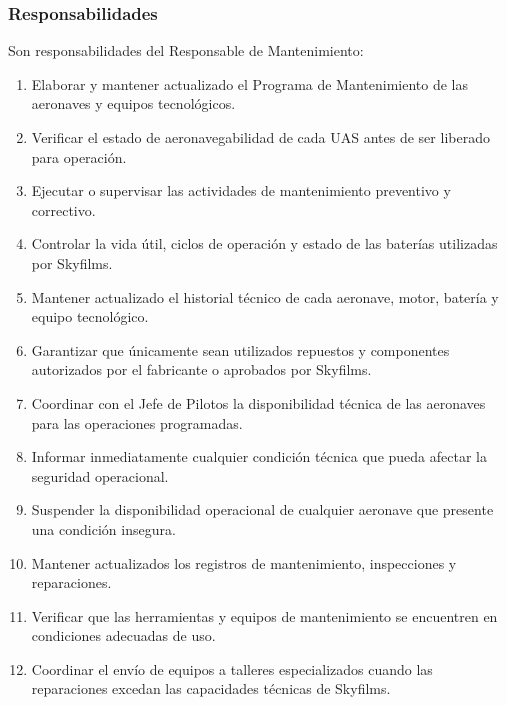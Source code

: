 \subsubsection*{Responsabilidades}

Son responsabilidades del Responsable de Mantenimiento:

\begin{enumerate}[label=\alph*)]

\item Elaborar y mantener actualizado el Programa de Mantenimiento de las aeronaves y equipos tecnológicos.

\item Verificar el estado de aeronavegabilidad de cada UAS antes de ser liberado para operación.

\item Ejecutar o supervisar las actividades de mantenimiento preventivo y correctivo.

\item Controlar la vida útil, ciclos de operación y estado de las baterías utilizadas por Skyfilms.

\item Mantener actualizado el historial técnico de cada aeronave, motor, batería y equipo tecnológico.

\item Garantizar que únicamente sean utilizados repuestos y componentes autorizados por el fabricante o aprobados por Skyfilms.

\item Coordinar con el Jefe de Pilotos la disponibilidad técnica de las aeronaves para las operaciones programadas.

\item Informar inmediatamente cualquier condición técnica que pueda afectar la seguridad operacional.

\item Suspender la disponibilidad operacional de cualquier aeronave que presente una condición insegura.

\item Mantener actualizados los registros de mantenimiento, inspecciones y reparaciones.

\item Verificar que las herramientas y equipos de mantenimiento se encuentren en condiciones adecuadas de uso.

\item Coordinar el envío de equipos a talleres especializados cuando las reparaciones excedan las capacidades técnicas de Skyfilms.

\end{enumerate}


